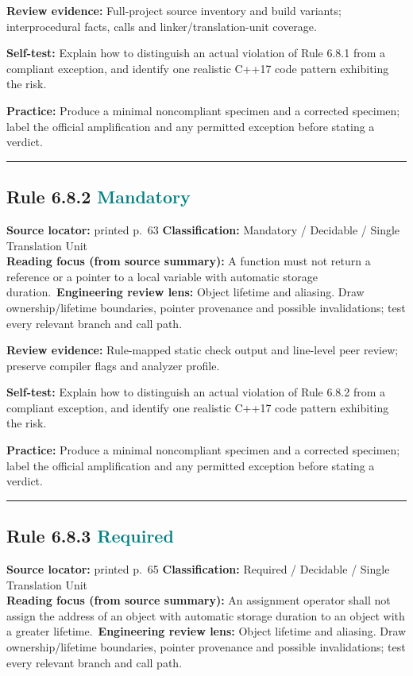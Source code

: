 \documentclass[10pt,letterpaper]{article}
\begin{document}
\textbf{Review evidence:} Full-project source inventory and build variants; interprocedural facts, calls and linker/translation-unit coverage.

\textbf{Self-test:} Explain how to distinguish an actual violation of Rule 6.8.1 from a compliant exception, and identify one realistic C++17 code pattern exhibiting the risk.\par
\textbf{Practice:} Produce a minimal noncompliant specimen and a corrected specimen; label the official amplification and any permitted exception before stating a verdict.
\smallskip\hrule\smallskip
\subsection*{Rule 6.8.2 \enspace \texorpdfstring{\small\textcolor{teal}{Mandatory}}{Mandatory}}
\noindent\textbf{Source locator:} printed p.~63 \quad\textbf{Classification:} Mandatory / Decidable / Single Translation Unit\\
\textbf{Reading focus (from source summary):} A function must not return a reference or a pointer to a local variable with automatic storage duration.\
\textbf{Engineering review lens:} Object lifetime and aliasing. Draw ownership/lifetime boundaries, pointer provenance and possible invalidations; test every relevant branch and call path.

\textbf{Review evidence:} Rule-mapped static check output and line-level peer review; preserve compiler flags and analyzer profile.

\textbf{Self-test:} Explain how to distinguish an actual violation of Rule 6.8.2 from a compliant exception, and identify one realistic C++17 code pattern exhibiting the risk.\par
\textbf{Practice:} Produce a minimal noncompliant specimen and a corrected specimen; label the official amplification and any permitted exception before stating a verdict.
\smallskip\hrule\smallskip
\subsection*{Rule 6.8.3 \enspace \texorpdfstring{\small\textcolor{teal}{Required}}{Required}}
\noindent\textbf{Source locator:} printed p.~65 \quad\textbf{Classification:} Required / Decidable / Single Translation Unit\\
\textbf{Reading focus (from source summary):} An assignment operator shall not assign the address of an object with automatic storage duration to an object with a greater lifetime.\
\textbf{Engineering review lens:} Object lifetime and aliasing. Draw ownership/lifetime boundaries, pointer provenance and possible invalidations; test every relevant branch and call path.
\end{document}
